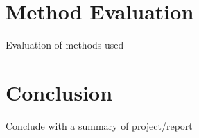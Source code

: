 \documentclass{article}
\begin{document}
\section{Method Evaluation}
\label{sec:methodeval}

Evaluation of methods used

\section{Conclusion}
\label{sec:con}

Conclude with a summary of project/report









\end{document}
